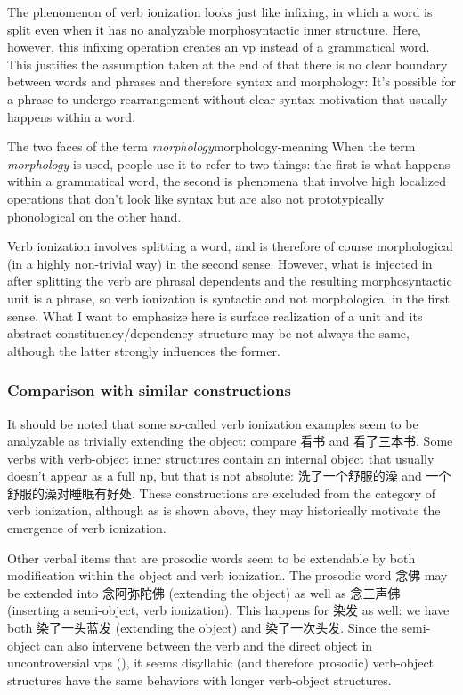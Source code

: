 \documentclass[UTF8, a4paper, oneside, scheme=plain]{ctexrep}
\newcommand*{\term}[1]{\emph{#1}}
\begin{document}
The phenomenon of verb ionization
looks just like infixing,
in which a word is split even when it has no analyzable morphosyntactic inner structure.
Here, however, this infixing operation creates an \acs{vp} instead of a grammatical word.
This justifies the assumption taken at the end of 
that there is no clear boundary between words and phrases 
and therefore syntax and morphology:
It's possible for a phrase to undergo 
rearrangement without clear syntax motivation
that usually happens within a word.

\begin{theorybox}{The two faces of the term \term{morphology}}{morphology-meaning}
    When the term \term{morphology} is used, 
    people use it to refer to two things:
    the first is what happens within a grammatical word, 
    the second is phenomena that involve high localized
    operations that don't look like syntax 
    but are also not prototypically phonological on the other hand. 
    
    Verb ionization involves 
    splitting a word,
    and is therefore of course morphological (in a highly non-trivial way)
    in the second sense.
    However, what is injected in after splitting the verb are phrasal dependents 
    and the resulting morphosyntactic unit is a phrase,
    so verb ionization is syntactic and not morphological in the first sense.
    What I want to emphasize here is surface realization of a unit 
    and its abstract constituency/dependency structure
    may be not always the same, 
    although the latter strongly influences the former.
\end{theorybox}

\subsubsection{Comparison with similar constructions}\label{sec:verb-phrase.ionization.similar}

It should be noted that some so-called verb ionization examples 
seem to be analyzable as 
trivially extending the object: 
compare 看书 and 看了三本书.
Some verbs with verb-object inner structures 
contain an internal object that usually doesn't appear as a full \acs{np}, 
but that is not absolute: 
洗了一个舒服的澡 and 一个舒服的澡对睡眠有好处.
These constructions are excluded from the category of verb ionization,
although as is shown above, 
they may historically motivate the emergence of verb ionization.

Other verbal items that are prosodic words
seem to be extendable by 
both modification within the object 
and verb ionization.
The prosodic word 念佛 may be extended into 念阿弥陀佛 (extending the object)
as well as 念三声佛 (inserting a semi-object, verb ionization).
This happens for 染发 as well: 
we have both 染了一头蓝发 (extending the object) 
and 染了一次头发.
Since the semi-object can also intervene
between the verb and the direct object in uncontroversial \acs{vp}s 
(), 
it seems disyllabic (and therefore prosodic) verb-object structures 
have the same behaviors with 
longer verb-object structures.
\end{document}
